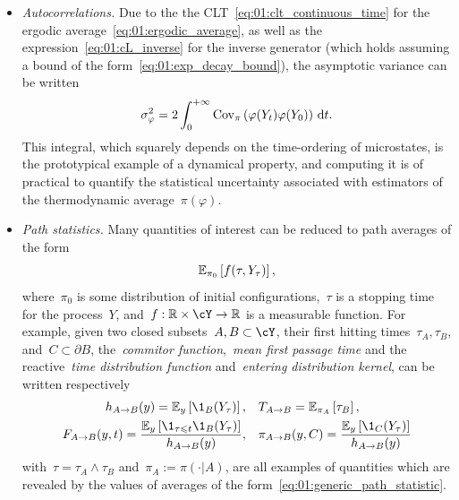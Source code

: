 \begin{itemize}
    \item{\textit{Autocorrelations.}
        Due to the the CLT~\eqref{eq:01:clt_continuous_time} for the ergodic average~\eqref{eq:01:ergodic_average}, as well as the expression~\eqref{eq:01:cL_inverse} for the inverse generator (which holds assuming a bound of the form~\eqref{eq:01:exp_decay_bound}), the asymptotic variance can be written
        \begin{equation}
            \label{eq:01:av_correlation_expression}
            \sigma_{\varphi}^2 = 2\int_0^{+\infty} \mathrm{Cov}_\pi\left(\varphi(Y_t)\varphi(Y_0)\right)\,\mathrm{d} t.
        \end{equation}
        This integral, which squarely depends on the time-ordering of microstates, is the prototypical example of a dynamical property, and computing it is of practical to quantify the statistical uncertainty associated with estimators of the thermodynamic average~$\pi(\varphi)$.
        }
    \item{\textit{Path statistics.}
        Many quantities of interest can be reduced to path averages of the form
        \begin{equation}
            \label{eq:01:generic_path_statistic}
            \mathbb{E}_{\pi_0}\left[f(\tau,Y_\tau)\right],
        \end{equation}
        where~$\pi_0$ is some distribution of initial configurations,~$\tau$ is a stopping time for the process~$Y$, and~$f:\R\times\cY\to\R$ is a measurable function.
        For example, given two closed subsets~$A,B\subset\cY$, their first hitting times~$\tau_A,\tau_B$, and~$C\subset \partial B$, the~\textit{commitor function},~\textit{mean first passage time} and the reactive~\textit{time distribution function} and~\textit{entering distribution kernel}, can be written respectively
        \begin{equation}
            \label{eq:01:path_statistics}
            \begin{aligned}
            h_{A\to B}(y)=\E_y\left[\1_B(Y_{\tau})\right],&\quad T_{A\to B}=\E_{\pi_A}\left[\tau_B\right],\\
            F_{A\to B}(y,t) = \frac{\E_y\left[\1_{\tau \leq t} \1_{B}(Y_{\tau})\right]}{h_{A\to B}(y)},&\quad \pi_{A\to B}(y,C) = \frac{\E_y\left[\1_{C}(Y_\tau)\right]}{h_{A\to B}(y)}
            \end{aligned}
        \end{equation}
        with~$\tau = \tau_A\land \tau_B$ and~$\pi_A := \pi(\cdot | A)$, are all examples of quantities which are revealed by the values of averages of the form~\eqref{eq:01:generic_path_statistic}.
        
}
\end{itemize}
